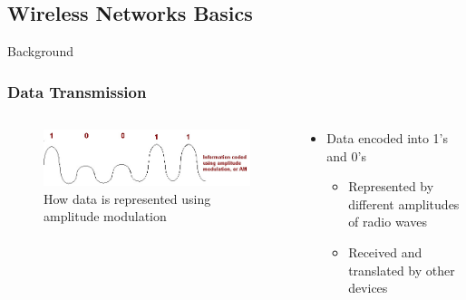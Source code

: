 \documentclass{beamer}
\begin{document}
\subsection{Wireless Networks Basics}

\begin{frame}{Background}
  \frametitle{Data Transmission}
  \begin{columns}
    \begin{column}{0.5\textwidth}
        \begin{figure}[htbp]
          \centering
          \includegraphics[width=\textwidth]{AMdataTransmission.jpg}
          \caption{How data is represented using amplitude modulation \cite{AMdata}}
          \label{fig:AM_data_transmission}
        \end{figure}
    \end{column}
    \begin{column}{0.5\textwidth}
      \begin{itemize}
        \item Data encoded into 1's and 0's
          \begin{itemize}
            \item Represented by different amplitudes of radio waves
            \item Received and translated by other devices
          \end{itemize}
      \end{itemize}
    \end{column}
  \end{columns}
\end{frame}
\end{document}
